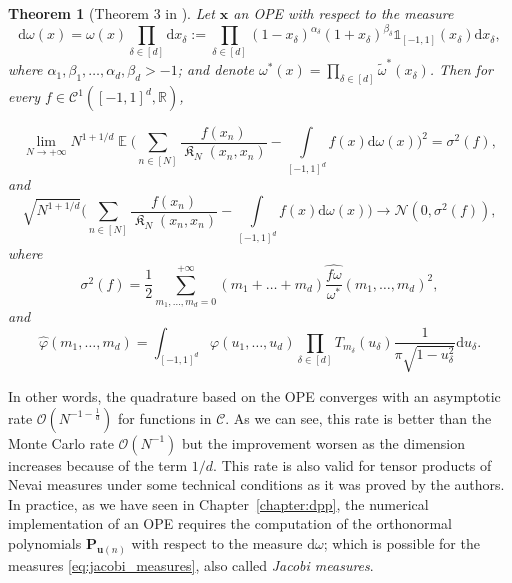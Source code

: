 \documentclass[twoside,11pt]{book}
\newtheorem{theorem}{Theorem}
\numberwithin{theorem}{chapter}
\numberwithin{definition}{chapter}
\numberwithin{proposition}{chapter}
\numberwithin{corollary}{chapter}
\numberwithin{example}{chapter}
\numberwithin{lemma}{chapter}
\DeclareMathOperator{\EX}{\mathbb{E}}
\DeclareMathOperator*{\KDPP}{\mathfrak{K}}
\begin{document}
\begin{theorem}[Theorem 3 in \citep{BaHa16}]
Let $\bm{x}$ an OPE with respect to the measure 
\begin{equation}\label{eq:jacobi_measures}
\mathrm{d}\omega(x) = \omega(x) \prod\limits_{\delta \in [d]} \mathrm{d}x_{\delta} := \prod\limits_{\delta \in [d]} (1-x_{\delta})^{\alpha_{\delta}}(1+x_{\delta})^{\beta_{\delta}} \mathbb{1}_{[-1,1]}(x_{\delta}) \mathrm{d}x_{\delta},
\end{equation}
where $\alpha_{1}, \beta_{1}, \dots, \alpha_{d}, \beta_{d} > -1$; and denote $\displaystyle \omega^{*}(x) = \prod\limits_{\delta \in [d]} \tilde{\omega}^{*}(x_{\delta})$.
Then for every $f \in \mathcal{C}^{1}([-1,1]^{d}, \mathbb{R})$,

\begin{equation}
\lim\limits_{N \rightarrow +\infty} N^{1+1/d} \EX \bigg( \sum_{n \in [N]}\frac{f(x_{n})}{\KDPP_{N}(x_{n},x_{n})} - \int\limits_{[-1,1]^{d}} f(x) \mathrm{d}\omega(x) \bigg)^{2}  =  \sigma^{2}(f),
\end{equation}
and
\begin{equation}
\sqrt{N^{1+1/d}} \big( \sum_{n \in [N]}\frac{f(x_{n})}{\KDPP_{N}(x_{n},x_{n})} - \int\limits_{[-1,1]^{d}} f(x) \mathrm{d}\omega(x) \big) \rightarrow \mathcal{N}(0,\sigma^{2}(f)),
\end{equation}
where
\begin{equation}
\sigma^{2}(f) = \frac{1}{2} \sum\limits_{m_{1}, \dots , m_{d} = 0}^{+\infty} (m_{1}+\dots +m_{d}) \widehat{\frac{f \omega}{\omega^{*}}} (m_{1}, \dots, m_{d})^{2},
\end{equation}
and 
\begin{equation}
\hat{\varphi}(m_{1},\dots,m_{d}) = \int_{[-1,1]^{d}} \varphi(u_{1}, \dots, u_{d}) \prod\limits_{\delta \in [d]} T_{m_{\delta}}(u_{\delta}) \frac{1}{\pi \sqrt{1-u_{\delta}^{2}}} \mathrm{d}u_{\delta}.
\end{equation}

\end{theorem}

In other words, the quadrature based on the OPE converges with an asymptotic rate $\mathcal{O}(N^{-1-\frac{1}{d}})$ for functions in $\mathcal{C}$. 
 As we can see, this rate is better than the Monte Carlo rate $\mathcal{O}(N^{-1})$ but the improvement worsen as the dimension increases because of the term $1/d$. This rate is also valid for tensor products of Nevai measures under some technical conditions as it was proved by the authors. In practice, as we have seen in Chapter~\ref{chapter:dpp}, the numerical implementation of an OPE requires the computation of the orthonormal polynomials $\bm{P}_{\bm{u}(n)}$ with respect to the measure $\mathrm{d}\omega$; which is possible for the measures \eqref{eq:jacobi_measures}, also called \emph{Jacobi measures}. 
\end{document}
